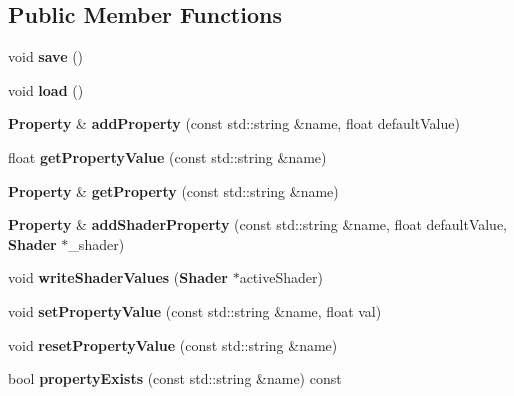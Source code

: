 \subsection*{Public Member Functions}
\begin{DoxyCompactItemize}
\item 
void {\bfseries save} ()\label{classsfs__visualizer_1_1PropertyManager_a3087ec9d3a94005856ace0297681fd0a}

\item 
void {\bfseries load} ()\label{classsfs__visualizer_1_1PropertyManager_a87bf025c3c2b5e8a81d5261c1d73e09d}

\item 
{\bf Property} \& {\bfseries add\-Property} (const std\-::string \&name, float default\-Value)\label{classsfs__visualizer_1_1PropertyManager_a618f5d0fb17a08ec5d80037094fff6d4}

\item 
float {\bfseries get\-Property\-Value} (const std\-::string \&name)\label{classsfs__visualizer_1_1PropertyManager_ae480b59e859ff350a0a3fad059b4c290}

\item 
{\bf Property} \& {\bfseries get\-Property} (const std\-::string \&name)\label{classsfs__visualizer_1_1PropertyManager_ab49b96d6505e30b658016798bfef1a87}

\item 
{\bf Property} \& {\bfseries add\-Shader\-Property} (const std\-::string \&name, float default\-Value, {\bf Shader} $\ast$\-\_\-shader)\label{classsfs__visualizer_1_1PropertyManager_a834cb4754f9f2ba229065656aa4eaf4a}

\item 
void {\bfseries write\-Shader\-Values} ({\bf Shader} $\ast$active\-Shader)\label{classsfs__visualizer_1_1PropertyManager_a18e78e31a6c5f6452fba1b1f13a8a3d9}

\item 
void {\bfseries set\-Property\-Value} (const std\-::string \&name, float val)\label{classsfs__visualizer_1_1PropertyManager_af63a1e6ff79a0b4e3623190d592c042d}

\item 
void {\bfseries reset\-Property\-Value} (const std\-::string \&name)\label{classsfs__visualizer_1_1PropertyManager_ac85444bdaeda56ad871f396e9ad2a2bf}

\item 
bool {\bfseries property\-Exists} (const std\-::string \&name) const \label{classsfs__visualizer_1_1PropertyManager_acf619e3ffa40610384545f1865dc460d}

\end{DoxyCompactItemize}
